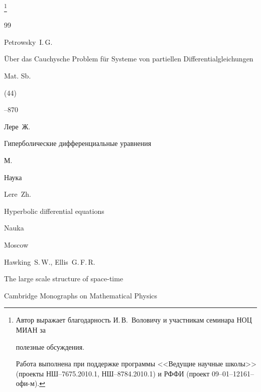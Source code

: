 \thanks{Автор выражает благодарность И.\,В.~Воловичу и участникам семинара НОЦ МИАН за

полезные обсуждения.  \par

Работа выполнена при поддержке программы <<Ведущие научные школы>> (проекты НШ--7675.2010.1,  НШ--8784.2010.1) и РФФИ (проект \mbox{09--01--12161--офи-м).}}





\begin{thebibliography}{99}






\by Petrowsky~I.\,G.

\paper \"Uber das Cauchysche Problem f\"ur Systeme von partiellen Diffe\-ren\-tial\-glei\-chun\-gen

\jour Mat. Sb.


(44)


--870






\by Лере~Ж.

\book Гиперболические дифференциальные уравнения

\publaddr М.

\publ Наука



\misctransl 

\by Lere~Zh.

\book Hyperbolic differential equations

\publ Nauka

\publaddr Moscow










\by Hawking~S.\,W., Ellis~G.\,F.\,R.

\book  The large scale structure of space-time

\serial Cambridge Mono\-graphs on Mathematical Physics


\end{thebibliography}
